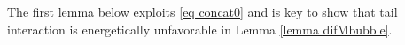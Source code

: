 \documentclass[11pt,letterpaper,reqno]{amsart}
\theoremstyle{plain}%
\theoremstyle{definition}
\numberwithin{equation}{section}
\numberwithin{figure}{section}
\begin{document}

The first lemma below exploits \eqref{eq concat0} and is key to show that tail interaction is energetically unfavorable in Lemma \ref{lemma difMbubble}. 
\end{document}
